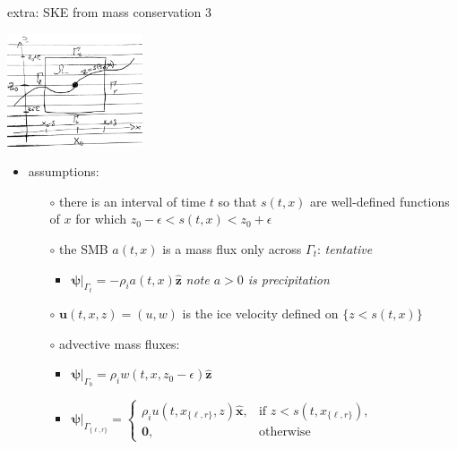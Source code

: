 \documentclass[10pt]{beamer}
\newcommand{\bu}{\mathbf{u}}
\newcommand{\hbx}{\hat{\mathbf{x}}}
\newcommand{\hbz}{\hat{\mathbf{z}}}
\newcommand{\bpsi}{\bm{\psi}}
\newcommand{\bzero}{\bm{0}}
\newcommand{\eps}{\epsilon}
\newcommand{\comm}[1]{{\footnotesize \hfill \emph{#1}}}
\begin{document}
\begin{frame}{extra: SKE from mass conservation 3}
\begin{center}
\includegraphics[width=0.3\textwidth]{skemassconservation.jpg}
\end{center}

\begin{itemize}
\item assumptions:
    \begin{itemize}
    \item[$\circ$] there is an interval of time $t$ so that $s(t,x)$ are well-defined functions of $x$ for which $z_0-\eps < s(t,x) < z_0 + \eps$
    \item[$\circ$] the SMB $a(t,x)$ is a mass flux only across $\Gamma_t$: \hfill \emph{tentative}
        \begin{itemize}
        \item $\bpsi\big|_{\Gamma_t} = - \rho_i a(t,x) \hbz$  \comm{note $a>0$ is precipitation}
        \end{itemize}
    \item[$\circ$] $\bu(t,x,z)=(u,w)$ is the ice velocity defined on $\{z<s(t,x)\}$
    \item[$\circ$] advective mass fluxes:
        \begin{itemize}
        \item $\bpsi\big|_{\Gamma_b} = \rho_i w(t,x,z_0-\eps) \hbz$
        \item $\bpsi\big|_{\Gamma_{\{\ell,r\}}} = \begin{cases} \rho_i u(t,x_{\{\ell,r\}},z) \hbx, & \text{if } z < s(t,x_{\{\ell,r\}}), \\ \bzero, & \text{otherwise} \end{cases}$
        \end{itemize}
    \end{itemize}
\end{itemize}
\end{frame}
\end{document}
